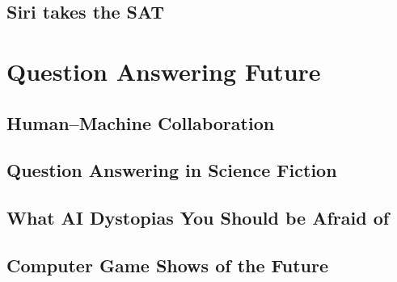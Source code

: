 \documentclass[bfivepaper,twosided,justified,nobib]{style/tufte-book}
\newif\ifproposal\proposalfalse
\newcommand{\proposalpart}[1]{
  \ifproposal
  \subsection{#1}
  \else
  \part{#1}
  \fi
}
\newcommand{\chapterfile}[3]{
  \ifproposal
  \paragraph{#3}
  
  \else
  \chapter{#3}
  \label{ch:#1}
  \begin{quote}
    
  \end{quote}
  
  \fi}
\begin{document}
\chapterfile{280}{leaderboards}{Siri takes the SAT}







\proposalpart{Question Answering Future}

\chapterfile{300}{datasets_adversarial}{Human--Machine Collaboration}

\chapterfile{310}{sci_fi}{Question Answering in Science Fiction}

\chapterfile{330}{fear_of_a_bot_planet}{What AI Dystopias You Should
  be Afraid of}




\chapterfile{340}{game_show}{Computer Game Shows of the Future}


\fi




\backmatter





\printindex
\end{document}
